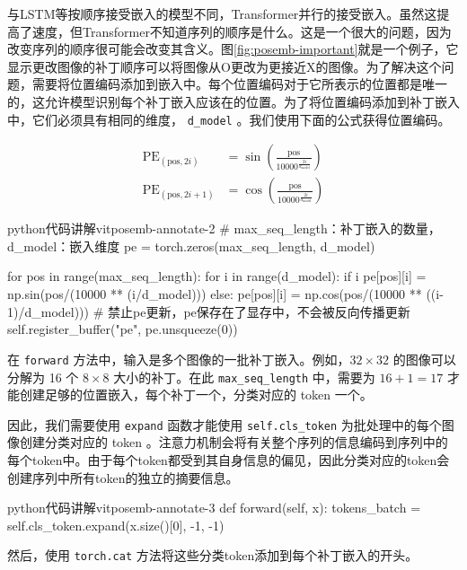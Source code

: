 \documentclass[lang=cn,newtx,10pt,scheme=chinese]{elegantbook}
\newcommand{\py}[1]{%
  \colorbox{gray!10}{\texttt{#1}}%
}
\begin{document}
与LSTM等按顺序接受嵌入的模型不同，Transformer并行的接受嵌入。虽然这提高了速度，但Transformer不知道序列的顺序是什么。这是一个很大的问题，因为改变序列的顺序很可能会改变其含义。图\ref{fig:posemb-important}就是一个例子，它显示更改图像的补丁顺序可以将图像从O更改为更接近X的图像。为了解决这个问题，需要将位置编码添加到嵌入中。每个位置编码对于它所表示的位置都是唯一的，这允许模型识别每个补丁嵌入应该在的位置。为了将位置编码添加到补丁嵌入中，它们必须具有相同的维度，\py{d_model} 。我们使用下面的公式获得位置编码。

\begin{equation}
\begin{aligned}
\text{PE}_{(\text{pos},2i)} &= \sin(\frac{\text{pos}}{10000^{\frac{2i}{d_{\text{model}}}}}) \\
\text{PE}_{(\text{pos},2i+1)} &= \cos(\frac{\text{pos}}{10000^{\frac{2i}{d_{\text{model}}}}})
\end{aligned}
\end{equation}

\begin{codebox}{python}{代码讲解}{vitposemb-annotate-2}
# max_seq_length：补丁嵌入的数量，d_model：嵌入维度
pe = torch.zeros(max_seq_length, d_model)

for pos in range(max_seq_length):
    for i in range(d_model):
        if i %
            pe[pos][i] = np.sin(pos/(10000 ** (i/d_model)))
        else:
            pe[pos][i] = np.cos(pos/(10000 ** ((i-1)/d_model)))
# 禁止pe更新，pe保存在了显存中，不会被反向传播更新
self.register_buffer("pe", pe.unsqueeze(0))
\end{codebox}

在 \py{forward} 方法中，输入是多个图像的一批补丁嵌入。例如，$32\times 32$ 的图像可以分解为 16 个 $8\times 8$ 大小的补丁。在此 \py{max_seq_length} 中，需要为 $16+1=17$ 才能创建足够的位置嵌入，每个补丁一个，分类对应的 token 一个。

因此，我们需要使用 \py{expand} 函数才能使用 \py{self.cls_token} 为批处理中的每个图像创建分类对应的 token 。注意力机制会将有关整个序列的信息编码到序列中的每个token中。由于每个token都受到其自身信息的偏见，因此分类对应的token会创建序列中所有token的独立的摘要信息。

\begin{codebox}{python}{代码讲解}{vitposemb-annotate-3}
def forward(self, x):
    tokens_batch = self.cls_token.expand(x.size()[0], -1, -1)
\end{codebox}

然后，使用 \py{torch.cat} 方法将这些分类token添加到每个补丁嵌入的开头。
\end{document}
